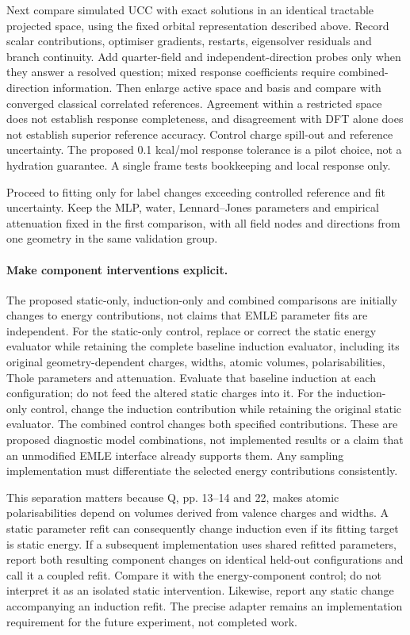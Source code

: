 \documentclass{article}
\begin{document}
Next compare simulated UCC with exact solutions in an identical tractable projected space, using the fixed orbital representation described above. Record scalar contributions, optimiser gradients, restarts, eigensolver residuals and branch continuity. Add quarter-field and independent-direction probes only when they answer a resolved question; mixed response coefficients require combined-direction information. Then enlarge active space and basis and compare with converged classical correlated references. Agreement within a restricted space does not establish response completeness, and disagreement with DFT alone does not establish superior reference accuracy. Control charge spill-out and reference uncertainty. The proposed 0.1 kcal/mol response tolerance is a pilot choice, not a hydration guarantee. A single frame tests bookkeeping and local response only.

Proceed to fitting only for label changes exceeding controlled reference and fit uncertainty. Keep the MLP, water, Lennard--Jones parameters and empirical attenuation fixed in the first comparison, with all field nodes and directions from one geometry in the same validation group.

\paragraph{Make component interventions explicit.}
The proposed static-only, induction-only and combined comparisons are initially changes to energy contributions, not claims that EMLE parameter fits are independent. For the static-only control, replace or correct the static energy evaluator while retaining the complete baseline induction evaluator, including its original geometry-dependent charges, widths, atomic volumes, polarisabilities, Thole parameters and attenuation. Evaluate that baseline induction at each configuration; do not feed the altered static charges into it. For the induction-only control, change the induction contribution while retaining the original static evaluator. The combined control changes both specified contributions. These are proposed diagnostic model combinations, not implemented results or a claim that an unmodified EMLE interface already supports them. Any sampling implementation must differentiate the selected energy contributions consistently.

This separation matters because Q, pp. 13--14 and 22, makes atomic polarisabilities depend on volumes derived from valence charges and widths. A static parameter refit can consequently change induction even if its fitting target is static energy. If a subsequent implementation uses shared refitted parameters, report both resulting component changes on identical held-out configurations and call it a coupled refit. Compare it with the energy-component control; do not interpret it as an isolated static intervention. Likewise, report any static change accompanying an induction refit. The precise adapter remains an implementation requirement for the future experiment, not completed work.
\end{document}
